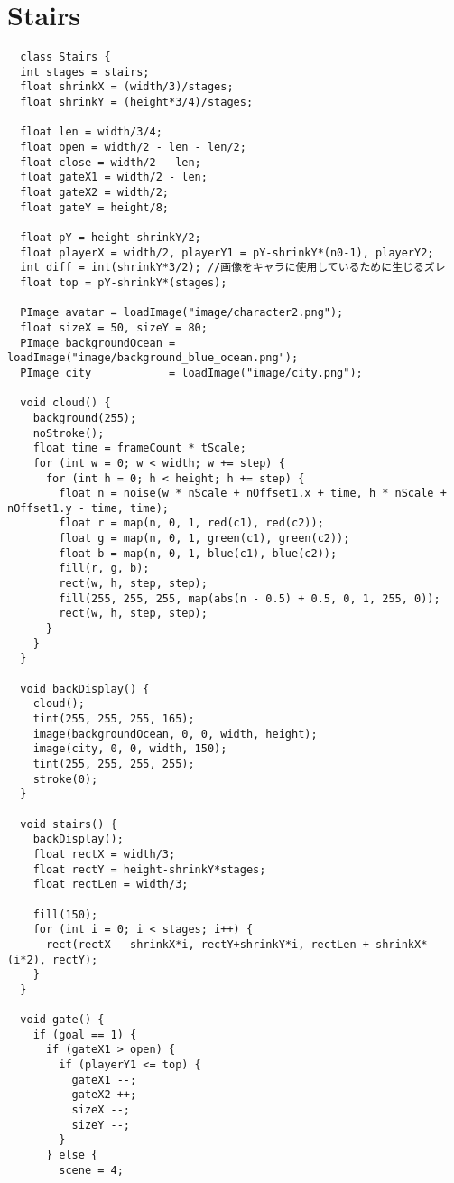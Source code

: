 \documentclass{jsarticle}
\begin{document}
\section{Stairs}
\begin{tiny}
  \begin{lstlisting}
  class Stairs {
  int stages = stairs;
  float shrinkX = (width/3)/stages;
  float shrinkY = (height*3/4)/stages;

  float len = width/3/4;
  float open = width/2 - len - len/2;
  float close = width/2 - len;
  float gateX1 = width/2 - len;
  float gateX2 = width/2;
  float gateY = height/8;

  float pY = height-shrinkY/2;
  float playerX = width/2, playerY1 = pY-shrinkY*(n0-1), playerY2;
  int diff = int(shrinkY*3/2); //画像をキャラに使用しているために生じるズレ
  float top = pY-shrinkY*(stages);

  PImage avatar = loadImage("image/character2.png");
  float sizeX = 50, sizeY = 80;
  PImage backgroundOcean = loadImage("image/background_blue_ocean.png");
  PImage city            = loadImage("image/city.png");

  void cloud() {
    background(255);
    noStroke();
    float time = frameCount * tScale;
    for (int w = 0; w < width; w += step) {
      for (int h = 0; h < height; h += step) {
        float n = noise(w * nScale + nOffset1.x + time, h * nScale + nOffset1.y - time, time);
        float r = map(n, 0, 1, red(c1), red(c2));
        float g = map(n, 0, 1, green(c1), green(c2));
        float b = map(n, 0, 1, blue(c1), blue(c2));
        fill(r, g, b);
        rect(w, h, step, step);
        fill(255, 255, 255, map(abs(n - 0.5) + 0.5, 0, 1, 255, 0));
        rect(w, h, step, step);
      }
    }
  }

  void backDisplay() {
    cloud();
    tint(255, 255, 255, 165);
    image(backgroundOcean, 0, 0, width, height);
    image(city, 0, 0, width, 150);
    tint(255, 255, 255, 255);
    stroke(0);
  }

  void stairs() {
    backDisplay();
    float rectX = width/3;
    float rectY = height-shrinkY*stages;
    float rectLen = width/3;

    fill(150);
    for (int i = 0; i < stages; i++) {
      rect(rectX - shrinkX*i, rectY+shrinkY*i, rectLen + shrinkX*(i*2), rectY);
    }
  }

  void gate() {
    if (goal == 1) {
      if (gateX1 > open) {
        if (playerY1 <= top) {
          gateX1 --;
          gateX2 ++;
          sizeX --;
          sizeY --;
        }
      } else {
        scene = 4;


\end{lstlisting}
\end{tiny}
\end{document}
